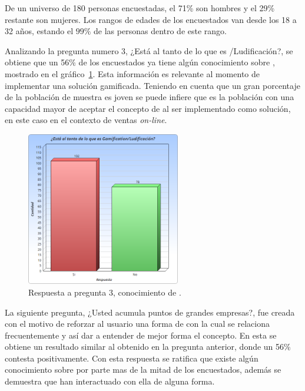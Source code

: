 De un universo de 180 personas encuestadas, el 71\% son hombres y el 29\%
restante son mujeres.
Los rangos de edades de los encuestados van desde los 18 a 32 años,
estando el $99\%$ de las personas dentro de este rango.

Analizando la pregunta numero 3,
¿Está al tanto de lo que es {\GAM}/Ludificación?, se obtiene que  un 56\% de los
encuestados ya tiene algún conocimiento sobre {\GAM}, mostrado en el
gráfico~\ref{fig:chart5.1}.
Esta información es relevante al momento de implementar una solución gamificada.
Teniendo en cuenta que un gran porcentaje de la población de muestra es joven
se puede infiere que es la población con una capacidad mayor de aceptar el
concepto de {\GAM} al ser implementado como solución, en este caso en el
contexto de ventas \emph{on-line}.

\begin{figure}[!htb]
    \centering
    \includegraphics[width=0.6\textwidth]{images/Graficos/graf_5_1.png}
    \caption[chart5.1]{Respuesta a pregunta $3$, conocimiento de {\GAM}.}
    \label{fig:chart5.1}
\end{figure}

La siguiente pregunta,
¿Usted acumula puntos de grandes empresas?, fue creada con el motivo de reforzar
al usuario una forma de {\GAM} con la cual se relaciona frecuentemente y así dar
a entender de mejor forma el concepto.
En esta se obtiene un resultado similar al obtenido en la pregunta anterior,
donde un 56\% contesta positivamente.
Con esta respuesta se ratifica que existe algún conocimiento sobre {\GAM} por parte
mas de la mitad de los encuestados, además se demuestra que han interactuado con
ella de alguna forma.

